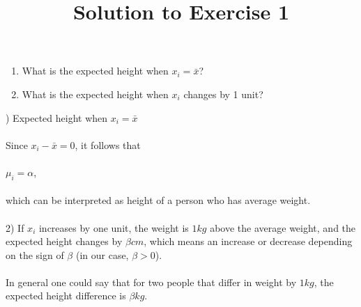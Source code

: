 \documentclass{article}
\title{Solution to Exercise 1}
\author{}
\date{}
\begin{document}
\begin{enumerate}
    \item What is the expected height when  $x_i = \bar{x}$?
    \item What is the expected height when $ x_i $ changes by 1 unit?
\end{enumerate}
\vspace{1cm}
) Expected height when \( x_i = \bar{x} \)\\
\\
Since $x_i - \bar{x} = 0$, it follows that\\
\\
$\mu_i = \alpha$,\\
\\
which can be interpreted as height of a person who has average weight.\\
\\
2) If $x_i$ increases by one unit, the weight is $1kg$ above the average weight,
and the expected height changes by $\beta cm$, which means an increase or decrease
depending on the sign of $\beta$ (in our case, $\beta >0$).\\
\\
In general one could say that for two people that differ in weight by $1kg$, the expected
height difference is $\beta kg$.
\end{document}
